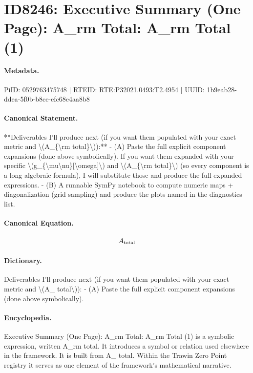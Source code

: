 \section*{ID8246: Executive Summary (One Page): A\_rm Total: A\_rm Total (1)}
\paragraph{Metadata.}
PiID: 0529763475748 | RTEID: RTE:P32021.0493:T2.4954 | UUID: 1b9eab28-ddea-5f0b-b8ce-efc68e4aa8b8

\paragraph{Canonical Statement.}
**Deliverables I’ll produce next (if you want them populated with your exact metric and \textbackslash{}(A\_\{\textbackslash{}rm total\}\textbackslash{})):** - (A) Paste the full explicit component expansions (done above symbolically). If you want them expanded with your specific \textbackslash{}(g\_\{\textbackslash{}mu\textbackslash{}nu\}[\textbackslash{}omega]\textbackslash{}) and \textbackslash{}(A\_\{\textbackslash{}rm total\}\textbackslash{}) (so every component is a long algebraic formula), I will substitute those and produce the full expanded expressions. - (B) A runnable SymPy notebook to compute numeric maps + diagonalization (grid sampling) and produce the plots named in the diagnostics list.

\paragraph{Canonical Equation.}
\[
A_{\rm total}
\]

\paragraph{Dictionary.}
Deliverables I’ll produce next (if you want them populated with your exact metric and \textbackslash{}(A\_ total\textbackslash{})): - (A) Paste the full explicit component expansions (done above symbolically).

\paragraph{Encyclopedia.}
Executive Summary (One Page): A\_rm Total: A\_rm Total (1) is a symbolic expression, written A\_rm total. It introduces a symbol or relation used elsewhere in the framework. It is built from A\_ total. Within the Trawin Zero Point registry it serves as one element of the framework's mathematical narrative.
